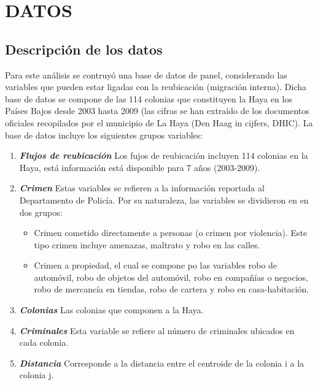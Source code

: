 \documentclass[letterpaper, 10 pt, conference]{ieeeconf}  %
\begin{document}
\section{DATOS}
\vspace{2mm}

\subsection{Descripci\'on de los datos}

Para este an\'alisis se contruy\'o una base de datos de panel, considerando  las variables que pueden estar ligadas con la reubicaci\'on (migraci\'on interna). Dicha base de datos se compone de las 114 colonias que constituyen la Haya en los Pa\'ises Bajos desde 2003 hasta 2009 (las cifras se han extra\'ido de los documentos oficiales recopilados por el municipio de La Haya (Den Haag in cijfers, DHIC). La base de datos incluye los siguientes grupos variables: 
\vspace{2mm}
\begin{enumerate}
\item \textit{\textbf{Flujos de reubicaci\'on}}
Los fujos de reubicaci\'on incluyen 114 colonias en la Haya, est\'a informaci\'on est\'a disponible para 7 a\~nos (2003-2009).
\vspace{2mm}
\item \textit{\textbf{Crimen}}
Estas variables se refieren a la informaci\'on reportada al Departamento de Polic\'ia. Por su naturaleza, las variables se dividieron en en dos grupos: 
\begin{itemize}
\item Crimen cometido directamente a personas (o crimen por violencia). Este tipo crimen incluye amenazas, maltrato y robo en las calles.
\item Crimen a propiedad, el cual se compone po las variables robo de autom\'ovil, robo de objetos del autom\'ovil, robo en compañ\'ias o negocios, robo de mercanc\'ia en tiendas, robo de cartera y robo en casa-habitaci\'on.
\end{itemize}
\vspace{2mm}
\item \textit{\textbf{Colonias}}
Las colonias que componen a la Haya.
\vspace{2mm}
\item \textit{\textbf{Criminales}}
Esta variable se refiere al n\'umero de criminales ubicados en cada colonia.
\vspace{2mm}
\item \textit{\textbf{Distancia}}
Corresponde a la distancia entre el centroide de la colonia i a la colonia j.
\end{enumerate}
\end{document}
